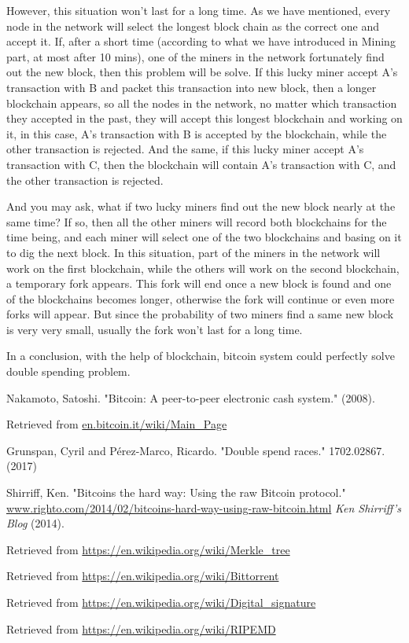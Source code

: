\documentclass[12pt,a4paper]{article}
\begin{document}
 However, this situation won't last for a long time. As we have mentioned, every node in the network will select the longest block chain as the correct one and accept it. If, after a short time (according to what we have introduced in Mining part, at most after 10 mins), one of the miners in the network fortunately find out the new block, then this problem will be solve. If this lucky miner accept A's transaction with B and packet this transaction into new block, then a longer blockchain appears, so all the nodes in the network, no matter which transaction they accepted in the past, they will accept this longest blockchain and working on it, in this case, A's transaction with B is accepted by the blockchain, while the other transaction is rejected. And the same, if this lucky miner accept A's transaction with C, then the blockchain will contain A's transaction with C, and the other transaction is rejected.
 
 And you may ask, what if two lucky miners find out the new block nearly at the same time? If so, then all the other miners will record both blockchains for the time being, and each miner will select one of the two blockchains and basing on it to dig the next block. In this situation, part of the miners in the network will work on the first blockchain, while the others will work on the second blockchain, a temporary fork appears. This fork will end once a new block is found and one of the blockchains becomes longer, otherwise the fork will continue or even more forks will appear. But since the probability of two miners find a same new block is very very small, usually the fork won't last for a long time.
 
 In a conclusion, with the help of blockchain, bitcoin system could perfectly solve double spending problem.

\begin{thebibliography}{1}
\newblock Nakamoto, Satoshi.
\newblock "Bitcoin: A peer-to-peer electronic cash system." (2008).

\newblock Retrieved from \url{en.bitcoin.it/wiki/Main_Page}

Grunspan, Cyril and Pérez-Marco, Ricardo.
\newblock "Double spend races."
 1702.02867.(2017)

Shirriff, Ken.
\newblock "Bitcoins the hard way: Using the raw Bitcoin protocol."
\newblock \url{www.righto.com/2014/02/bitcoins-hard-way-using-raw-bitcoin.html} {\em Ken Shirriff's Blog} (2014).


\newblock Retrieved from \url{https://en.wikipedia.org/wiki/Merkle_tree}

\newblock Retrieved from \url{https://en.wikipedia.org/wiki/Bittorrent}

\newblock Retrieved from \url{https://en.wikipedia.org/wiki/Digital_signature}

\newblock Retrieved from \url{https://en.wikipedia.org/wiki/RIPEMD}

\url{}
\end{thebibliography}
\end{document}
